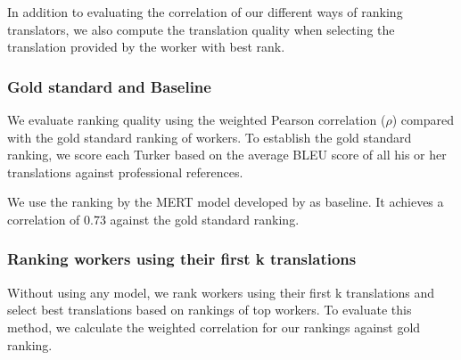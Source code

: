 \documentclass[11pt,letterpaper]{article}
\begin{document}
In addition to evaluating the correlation of our different ways of ranking translators, we also compute the translation quality when selecting the translation provided by the worker with best rank.



\subsubsection{Gold standard and Baseline}
We evaluate ranking quality using the weighted Pearson correlation ($\rho$) compared with the gold standard ranking of workers. 
To establish the gold standard ranking, we score each Turker based on the average BLEU score of all his or her translations against professional references.

We use the ranking by the MERT model developed by  as baseline. It achieves a correlation of 0.73 against the gold standard ranking. 




\subsubsection{Ranking workers using their first k translations}
 Without using any model, we rank workers using their first k translations and select best translations based on rankings of top workers. To evaluate this method, we calculate the weighted correlation for our rankings against gold ranking. 
\end{document}
